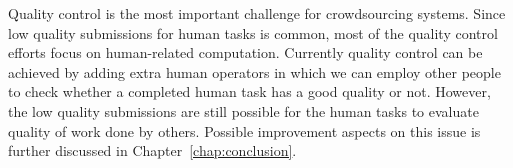 Quality control is the most important challenge for crowdsourcing systems. Since low quality submissions for human tasks is common, most of the quality control efforts focus on human-related computation. Currently quality control can be achieved by adding extra human operators in which we can employ other people to check whether a completed human task has a good quality or not. However, the low quality submissions are still possible for the human tasks to evaluate quality of work done by others. Possible improvement aspects on this issue is further discussed in Chapter~\ref{chap:conclusion}.